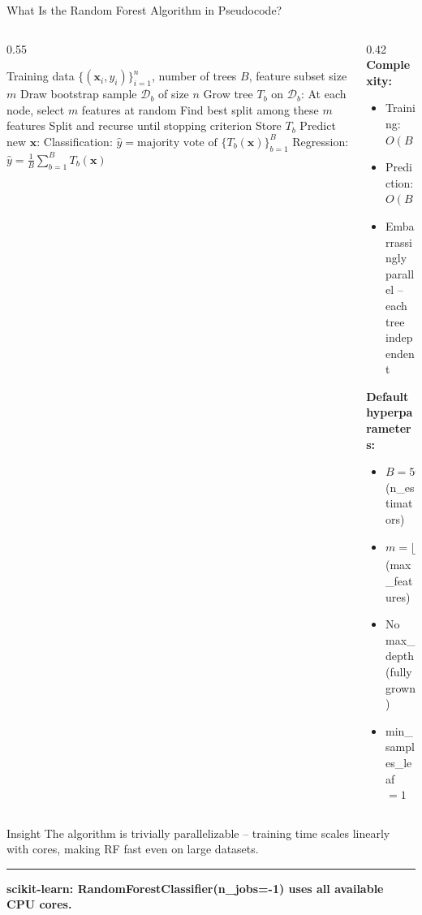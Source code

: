 \documentclass[8pt,aspectratio=169]{beamer}
\newcommand{\bottomnote}[1]{%
\vfill
\vspace{-2mm}
\textcolor{mllavender2}{\rule{\textwidth}{0.4pt}}
\vspace{1mm}
\footnotesize
\textbf{#1}
}
\newenvironment{compactlist}{%
  \begin{itemize}%
    \setlength{\itemsep}{2pt}%
    \setlength{\parskip}{0pt}%
    \setlength{\parsep}{0pt}%
}{%
  \end{itemize}%
}
\begin{document}
\begin{frame}[fragile]{What Is the Random Forest Algorithm in Pseudocode?}
\begin{columns}[T]
\begin{column}{0.55\textwidth}
\small
\begin{algorithmic}[1]
\REQUIRE Training data $\{(\mathbf{x}_i, y_i)\}_{i=1}^n$, number of trees $B$, feature subset size $m$
  \STATE Draw bootstrap sample $\mathcal{D}_b$ of size $n$
  \STATE Grow tree $T_b$ on $\mathcal{D}_b$:
  \STATE \quad At each node, select $m$ features at random
  \STATE \quad Find best split among these $m$ features
  \STATE \quad Split and recurse until stopping criterion
  \STATE Store $T_b$
\ENDFOR
\ENSURE Predict new $\mathbf{x}$:
\STATE Classification: $\hat{y} = \text{majority vote of } \{T_b(\mathbf{x})\}_{b=1}^B$
\STATE Regression: $\hat{y} = \frac{1}{B}\sum_{b=1}^{B} T_b(\mathbf{x})$
\end{algorithmic}
\end{column}
\begin{column}{0.42\textwidth}
\footnotesize
\textbf{Complexity:}
\begin{compactlist}
\item Training: $O(B \cdot n \log n \cdot m)$
\item Prediction: $O(B \cdot \text{depth})$
\item Embarrassingly parallel -- each tree independent
\end{compactlist}

\vspace{0.5em}
\textbf{Default hyperparameters:}
\begin{compactlist}
\item $B = 500$ (n\_estimators)
\item $m = \lfloor\sqrt{p}\rfloor$ (max\_features)
\item No max\_depth (fully grown)
\item min\_samples\_leaf $= 1$
\end{compactlist}
\end{column}
\end{columns}

\begin{block}{Insight}
\scriptsize The algorithm is trivially parallelizable -- training time scales linearly with cores, making RF fast even on large datasets.
\end{block}
\bottomnote{scikit-learn: RandomForestClassifier(n\_jobs=-1) uses all available CPU cores.}
\end{frame}
\end{document}
